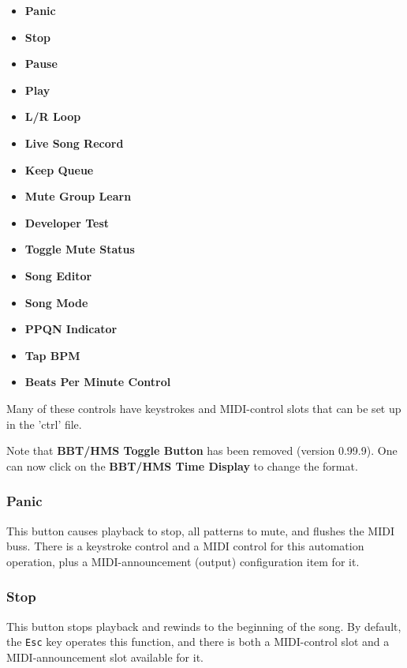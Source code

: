    \begin{itemize}
      \item \textbf{Panic}
      \item \textbf{Stop}
      \item \textbf{Pause}
      \item \textbf{Play}
      \item \textbf{L/R Loop}
      \item \textbf{Live Song Record}
      \item \textbf{Keep Queue}
      \item \textbf{Mute Group Learn}
      \item \textbf{Developer Test}
      \item \textbf{Toggle Mute Status}
      \item \textbf{Song Editor}
      \item \textbf{Song Mode}
      \item \textbf{PPQN Indicator}
      \item \textbf{Tap BPM}
      \item \textbf{Beats Per Minute Control}
   \end{itemize}

   Many of these controls have keystrokes and MIDI-control slots that can be
   set up in the 'ctrl' file.

   Note that \textbf{BBT/HMS Toggle Button} has been removed
   (version 0.99.9).
   One can now click on the \textbf{BBT/HMS Time Display} to
   change the format.

\subsubsection{Panic}
\label{subsubsec:introduction_panic_button}

   This button causes playback to stop, all patterns to mute, and flushes the
   MIDI buss.
   There is a keystroke control and a MIDI control
   for this automation operation, plus
   a MIDI-announcement (output) configuration item for it.

\subsubsection{Stop}
\label{subsubsec:introduction_stop_button}

   This button stops playback and rewinds to the beginning of the song.
   By default, the \texttt{Esc} key operates this function,
   and there is both a MIDI-control slot and a MIDI-announcement slot
   available for it.

